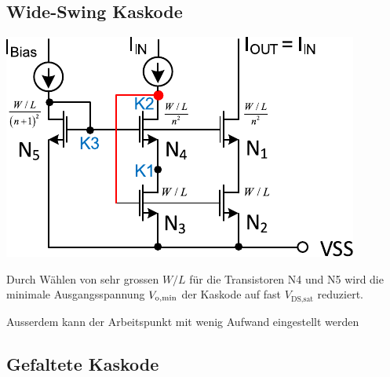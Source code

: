 \subsection{Wide-Swing Kaskode}

\begin{minipage}[t]{0.4\columnwidth}
    \includegraphics[width=\columnwidth, align=t]{images/07_wide_swing_kaskode.pdf}
\end{minipage}
\hfill
\begin{minipage}[t]{0.56\columnwidth}
    Durch Wählen von sehr grossen $W/L$ für die Transistoren N4 und N5 wird die minimale Ausgangsspannung $V_{\rm o, min}$ der Kaskode auf fast $V_\text{DS,sat}$ reduziert.
    
    Ausserdem kann der Arbeitspunkt mit wenig Aufwand eingestellt werden
\end{minipage}



\subsection{Gefaltete Kaskode}


